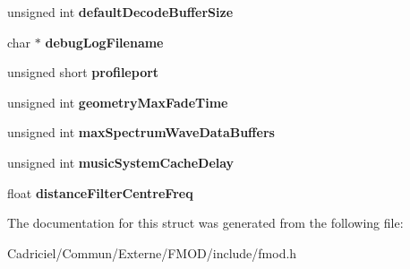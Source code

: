 \begin{DoxyCompactItemize}
\item 
\hypertarget{struct_f_m_o_d___a_d_v_a_n_c_e_d_s_e_t_t_i_n_g_s_a8b2d2802cd34875f10d319c8f363e399}{unsigned int {\bfseries default\-Decode\-Buffer\-Size}}\label{struct_f_m_o_d___a_d_v_a_n_c_e_d_s_e_t_t_i_n_g_s_a8b2d2802cd34875f10d319c8f363e399}

\item 
\hypertarget{struct_f_m_o_d___a_d_v_a_n_c_e_d_s_e_t_t_i_n_g_s_a00d10a918d3414c8f4bde3664f01b44f}{char $\ast$ {\bfseries debug\-Log\-Filename}}\label{struct_f_m_o_d___a_d_v_a_n_c_e_d_s_e_t_t_i_n_g_s_a00d10a918d3414c8f4bde3664f01b44f}

\item 
\hypertarget{struct_f_m_o_d___a_d_v_a_n_c_e_d_s_e_t_t_i_n_g_s_a5d12c84c6911facd30fcba7ab0dd7faa}{unsigned short {\bfseries profileport}}\label{struct_f_m_o_d___a_d_v_a_n_c_e_d_s_e_t_t_i_n_g_s_a5d12c84c6911facd30fcba7ab0dd7faa}

\item 
\hypertarget{struct_f_m_o_d___a_d_v_a_n_c_e_d_s_e_t_t_i_n_g_s_a973568fb1ec638193a0b0198d4165558}{unsigned int {\bfseries geometry\-Max\-Fade\-Time}}\label{struct_f_m_o_d___a_d_v_a_n_c_e_d_s_e_t_t_i_n_g_s_a973568fb1ec638193a0b0198d4165558}

\item 
\hypertarget{struct_f_m_o_d___a_d_v_a_n_c_e_d_s_e_t_t_i_n_g_s_a0404a31fe61b9d4e2340125a2a38a00d}{unsigned int {\bfseries max\-Spectrum\-Wave\-Data\-Buffers}}\label{struct_f_m_o_d___a_d_v_a_n_c_e_d_s_e_t_t_i_n_g_s_a0404a31fe61b9d4e2340125a2a38a00d}

\item 
\hypertarget{struct_f_m_o_d___a_d_v_a_n_c_e_d_s_e_t_t_i_n_g_s_abb66bb0cce280bd12f4092d2b3f642d1}{unsigned int {\bfseries music\-System\-Cache\-Delay}}\label{struct_f_m_o_d___a_d_v_a_n_c_e_d_s_e_t_t_i_n_g_s_abb66bb0cce280bd12f4092d2b3f642d1}

\item 
\hypertarget{struct_f_m_o_d___a_d_v_a_n_c_e_d_s_e_t_t_i_n_g_s_aec899d9cc69d0d664393d48f87dd9373}{float {\bfseries distance\-Filter\-Centre\-Freq}}\label{struct_f_m_o_d___a_d_v_a_n_c_e_d_s_e_t_t_i_n_g_s_aec899d9cc69d0d664393d48f87dd9373}

\end{DoxyCompactItemize}


The documentation for this struct was generated from the following file\-:\begin{DoxyCompactItemize}
\item 
Cadriciel/\-Commun/\-Externe/\-F\-M\-O\-D/include/fmod.\-h\end{DoxyCompactItemize}
